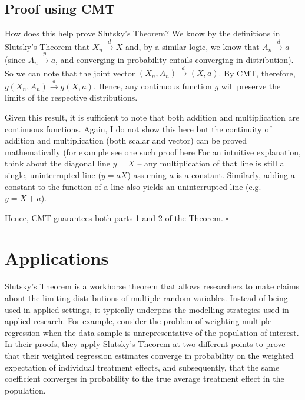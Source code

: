\documentclass[
]{book}
\begin{document}
\hypertarget{proof-using-cmt}{%
\subsection{Proof using CMT}\label{proof-using-cmt}}

How does this help prove Slutsky's Theorem? We know by the definitions in Slutsky's Theorem that \(X_n \xrightarrow{d} X\) and, by a similar logic, we know that \(A_n \xrightarrow{d} a\) (since \(A_n \xrightarrow{p} a\), and converging in probability entails converging in distribution). So we can note that the joint vector \((X_n, A_n) \xrightarrow{d} (X,a)\). By CMT, therefore, \(g(X_n, A_n) \xrightarrow{d} g(X,a)\). Hence, any continuous function \(g\) will preserve the limits of the respective distributions.

Given this result, it is sufficient to note that both addition and multiplication are continuous functions. Again, I do not show this here but the continuity of addition and multiplication (both scalar and vector) can be proved mathematically (for example see one such proof \href{http://mathonline.wikidot.com/continuity-of-addition-scalar-multiplication-and-multiplicat\%5D.}{here} For an intuitive explanation, think about the diagonal line \(y=X\) -- any multiplication of that line is still a single, uninterrupted line (\(y = aX\)) assuming \(a\) is a constant. Similarly, adding a constant to the function of a line also yields an uninterrupted line (e.g.~\(y= X + a\)).

Hence, CMT guarantees both parts 1 and 2 of the Theorem. \(\square\)

\hypertarget{applications_slutsky}{%
\section{Applications}\label{applications_slutsky}}

Slutsky's Theorem is a workhorse theorem that allows researchers to make claims about the limiting distributions of multiple random variables. Instead of being used in applied settings, it typically underpins the modelling strategies used in applied research. For example, \citet{aronow_representative2015} consider the problem of weighting multiple regression when the data sample is unrepresentative of the population of interest. In their proofs, they apply Slutsky's Theorem at two different points to prove that their weighted regression estimates converge in probability on the weighted expectation of individual treatment effects, and subsequently, that the same coefficient converges in probability to the true average treatment effect in the population.
\end{document}
